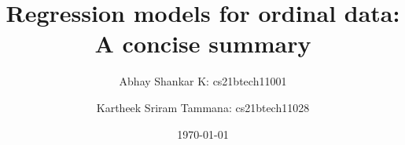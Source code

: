 \documentclass[reqno]{amsart}
\begin{document}
    \title{Regression models for ordinal data: A concise summary}
    \author{Abhay Shankar K: cs21btech11001}
    \author{Kartheek Sriram Tammana: cs21btech11028}
    \date{\today}
    
    \maketitle




            




\end{document}
